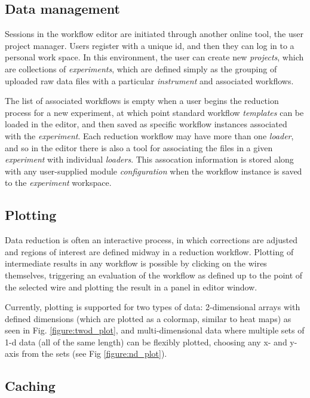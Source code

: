 \documentclass[pdf]{iucr}           %
\begin{document}
\subsection{Data management}

Sessions in the workflow editor are initiated through another online tool, the user project manager.
Users register with a unique id, and then they can log in to a personal work space.  
In this environment, the user can create new \emph{projects}, which are collections of \emph{experiments},
which are defined simply as the grouping of uploaded raw data files with a particular \emph{instrument} and
associated workflows.  

The list of associated workflows is empty when a user begins the reduction process for a new experiment,
at which point standard workflow \emph{templates} can be loaded in the editor, and then saved as specific
workflow instances associated with the \emph{experiment}.  Each reduction workflow may have more than one \emph{loader},
and so in the editor there is also a tool for associating the files in a given \emph{experiment} with individual
\emph{loaders}.  This assocation information is stored along with any user-supplied module \emph{configuration}
when the workflow instance is saved to the \emph{experiment} workspace.

\subsection{Plotting}

Data reduction is often an interactive process, in which corrections are adjusted and regions of interest
are defined midway in a reduction workflow.  Plotting of intermediate results in any workflow is possible 
by clicking on the wires themselves, triggering an evaluation of the workflow as defined up to the point of
the selected wire and plotting the result in a panel in editor window.  

Currently, plotting is supported for two types of data: 2-dimensional arrays with defined dimensions
(which are plotted as a colormap, similar to heat maps) as seen in Fig. \ref{figure:twod_plot},
and multi-dimensional data where multiple sets
of 1-d data (all of the same length) can be flexibly plotted, choosing any x- and y-axis from the sets
 (see Fig \ref{figure:nd_plot}).

\subsection{Caching}
\end{document}
